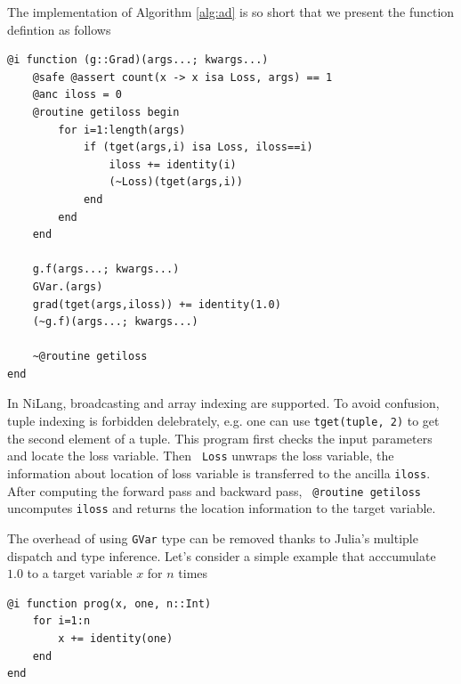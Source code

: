 \documentclass[aps,twocolumn,longbibliography,english,superscriptaddress,prr]{revtex4-1}
\newcommand{\<}{\langle}
\renewcommand{\>}{\rangle}
\theoremstyle{definition}\newtheorem{definition}{\textit{Definition}}
\begin{document}
The implementation of Algorithm \ref{alg:ad} is so short that we present the function defintion as follows

\begin{minipage}{.44\textwidth}
\begin{lstlisting}
@i function (g::Grad)(args...; kwargs...)
    @safe @assert count(x -> x isa Loss, args) == 1
    @anc iloss = 0
    @routine getiloss begin
        for i=1:length(args)
            if (tget(args,i) isa Loss, iloss==i)
                iloss += identity(i)
                (~Loss)(tget(args,i))
            end
        end
    end

    g.f(args...; kwargs...)
    GVar.(args)
    grad(tget(args,iloss)) += identity(1.0)
    (~g.f)(args...; kwargs...)

    ~@routine getiloss
end
\end{lstlisting}
\end{minipage}

In NiLang, broadcasting and array indexing are supported. To avoid confusion, tuple indexing is forbidden delebrately, e.g. one can use \texttt{tget(tuple, 2)} to get the second element of a tuple.
This program first checks the input parameters and locate the loss variable.
Then \texttt{~Loss} unwraps the loss variable, the information about location of loss variable is transferred to the ancilla \texttt{iloss}.
After computing the forward pass and backward pass, \texttt{~@routine getiloss} uncomputes \texttt{iloss} and returns the location information to the target variable.

The overhead of using \texttt{GVar} type can be removed thanks to Julia's multiple dispatch and type inference. Let's consider a simple example that acccumulate $1.0$ to a target variable $x$ for $n$ times

\begin{minipage}{.44\textwidth}
\begin{lstlisting}
@i function prog(x, one, n::Int)
    for i=1:n
        x += identity(one)
    end
end
\end{lstlisting}
\end{minipage}
\end{document}
